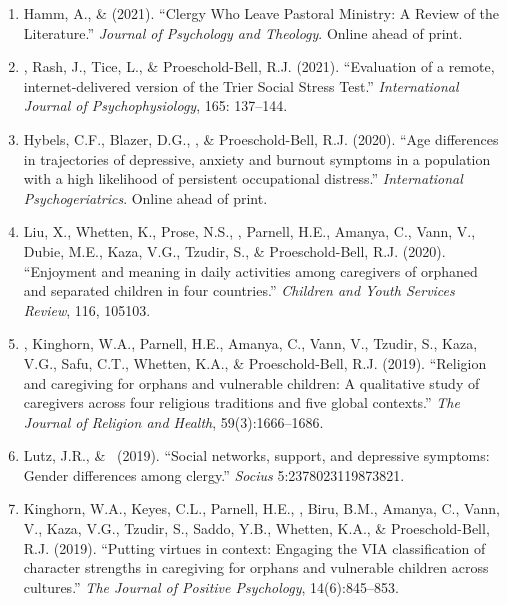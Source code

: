 \begin{enumerate}
\item Hamm, A., \&  \Eagle \hspace{.01em} (2021). ``Clergy Who Leave Pastoral Ministry: A Review of the Literature.'' \textit{Journal of Psychology and Theology}. Online ahead of print. 

\item \Eagle, Rash, J., Tice, L., \& Proeschold-Bell, R.J. (2021). ``Evaluation of a remote, internet-delivered version of the Trier Social Stress Test.'' \textit{International Journal of Psychophysiology}, 165: 137--144. 

\item Hybels, C.F., Blazer, D.G., \Eagle, \& Proeschold-Bell, R.J. (2020). ``Age differences in trajectories of depressive, anxiety and burnout symptoms in a population with a high likelihood of persistent occupational distress.'' \emph{International Psychogeriatrics}. Online ahead of print. 

\item Liu, X., Whetten, K., Prose, N.S., \Eagle, Parnell, H.E., Amanya, C., Vann, V., Dubie, M.E., Kaza, V.G., Tzudir, S., \& Proeschold-Bell, R.J. (2020). ``Enjoyment and meaning in daily activities among caregivers of orphaned and separated children in four countries.'' \emph{Children and Youth Services Review}, 116, 105103. 

\item \Eagle, Kinghorn, W.A., Parnell, H.E., Amanya, C., Vann, V., Tzudir, S., Kaza, V.G., Safu, C.T., Whetten, K.A., \& Proeschold-Bell, R.J. (2019). ``Religion and caregiving for orphans and vulnerable children: A qualitative study of caregivers across four religious traditions and five global contexts.'' \emph{The Journal of Religion and Health}, 59(3):1666--1686. 

\item Lutz, J.R., \& \Eagle\CS\ (2019). ``Social networks, support, and depressive symptoms: Gender differences among clergy.'' \emph{Socius} 5:2378023119873821. 

\item Kinghorn, W.A., Keyes, C.L., Parnell, H.E., \Eagle, Biru, B.M., Amanya, C., Vann, V., Kaza, V.G., Tzudir, S., Saddo, Y.B., Whetten, K.A., \& Proeschold-Bell, R.J. (2019). ``Putting virtues in context: Engaging the VIA classification of character strengths in caregiving for orphans and vulnerable children across cultures.'' \emph{The Journal of Positive Psychology}, 14(6):845--853. 


\end{enumerate}
